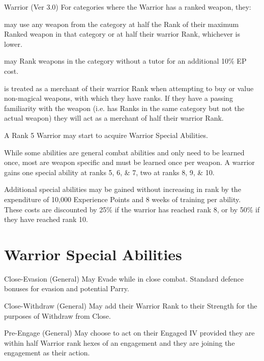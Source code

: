 \begin{Chapter}{Warrior (Ver 3.0)}
For categories where the Warrior has a ranked weapon, they:

\begin{Itemize}

\item may use any weapon from the category at half the Rank of their
  maximum Ranked weapon in that category or at half their warrior
  Rank, whichever is lower.

\item may Rank weapons in the category without a tutor for an
  additional 10\% EP cost.

\item is treated as a merchant of their warrior Rank when attempting
  to buy or value non-magical weapons, with which they have ranks.  If
  they have a passing familiarity with the weapon (i.e.  has Ranks in
  the same category but not the actual weapon) they will act as a
  merchant of half their warrior Rank.

\end{Itemize}

A Rank 5 Warrior may start to acquire Warrior Special Abilities.

While some abilities are general combat abilities and only need to be
learned once, most are weapon specific and must be learned once per
weapon.  A warrior gains one special ability at ranks 5, 6, \& 7, two
at ranks 8, 9, \& 10.

Additional special abilities may be gained without increasing in rank
by the expenditure of 10,000 Experience Points and 8 weeks of training
per ability.  These costs are discounted by 25\% if the warrior has
reached rank 8, or by 50\% if they have reached rank 10.

\section{Warrior Special Abilities}

\begin{Description}
\item[Close-Evasion (General)] May Evade while in close combat.
  Standard defence bonuses for evasion and potential Parry.

\item[Close-Withdraw (General)] May add their Warrior Rank to their
  Strength for the purposes of Withdraw from Close.

\item[Pre-Engage (General)] May choose to act on their Engaged IV
  provided they are within half Warrior rank hexes of an engagement
  and they are joining the engagement as their action.


\end{Description}
\end{Chapter}
